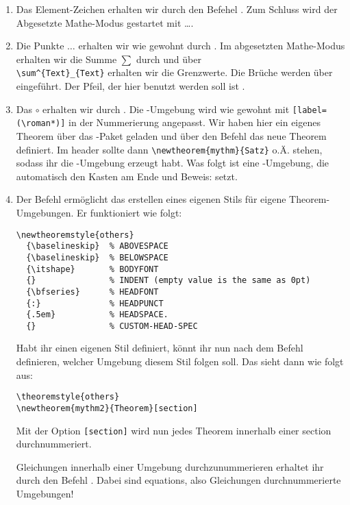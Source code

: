\begin{uebung}
\begin{enumerate}[label=(\alph*)]
        \end{enumerate}
        \begin{loesung}
            \begin{enumerate}
                \item Das Element-Zeichen erhalten wir durch den Befehel . Zum Schluss wird der Abgesetzte Mathe-Modus gestartet mit \cmd{[} \dots \cmd{]}. 
                \item Die Punkte $\dots$ erhalten wir wie gewohnt durch . Im abgesetzten Mathe-Modus erhalten wir die Summe $\sum$ durch  und über \\ \verb|\sum^{Text}_{Text}| erhalten wir die Grenzwerte. Die Brüche werden über  eingeführt. Der Pfeil, der hier benutzt werden soll ist .
                \item Das $\circ$ erhalten wir durch . Die -Umgebung wird wie gewohnt mit \verb|[label=(\roman*)]| in der Nummerierung angepasst. Wir haben hier ein eigenes Theorem über das -Paket geladen und über den Befehl  das neue Theorem definiert. Im header sollte dann \verb|\newtheorem{mythm}{Satz}| o.Ä. stehen, sodass ihr die -Umgebung erzeugt habt. Was folgt ist eine -Umgebung, die automatisch den Kasten am Ende und \glqq Beweis:\grqq{} setzt.
                \item Der Befehl  ermöglicht das erstellen eines eigenen Stils für eigene Theorem-Umgebungen. Er funktioniert wie folgt:\\
\begin{verbatim}
\newtheoremstyle{others} 
  {\baselineskip}  % ABOVESPACE
  {\baselineskip}  % BELOWSPACE
  {\itshape}       % BODYFONT
  {}               % INDENT (empty value is the same as 0pt)
  {\bfseries}      % HEADFONT
  {:}              % HEADPUNCT
  {.5em}           % HEADSPACE. 
  {}               % CUSTOM-HEAD-SPEC
\end{verbatim}
                    Habt ihr einen eigenen Stil definiert, könnt ihr nun nach dem Befehl \\  definieren, welcher Umgebung diesem Stil folgen soll. Das sieht dann wie folgt aus:
\begin{verbatim}
\theoremstyle{others}
\newtheorem{mythm2}{Theorem}[section]
\end{verbatim}
                    Mit der Option \verb|[section]| wird nun jedes Theorem innerhalb einer section durchnummeriert. 
                    
                    Gleichungen innerhalb einer Umgebung durchzunummerieren erhaltet ihr durch den Befehl . Dabei sind equations, also Gleichungen durchnummerierte Umgebungen!
            \end{enumerate}
        \end{loesung}
\end{uebung}